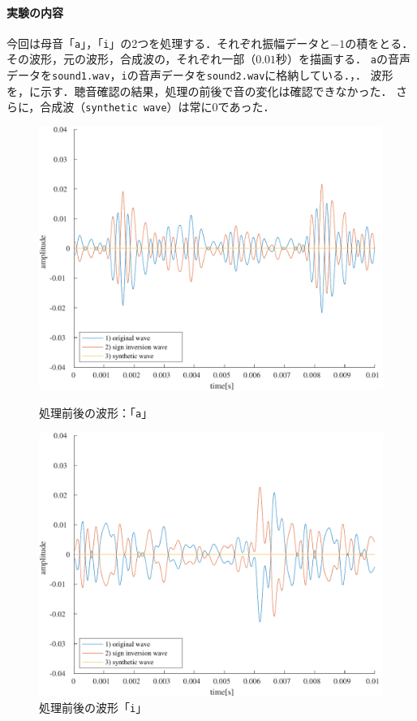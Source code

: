 \paragraph{実験の内容}
今回は母音「\texttt{a}」，「\texttt{i}」の2つを処理する．それぞれ振幅データと\(-1\)の積をとる．その波形，元の波形，合成波の，それぞれ一部（\(0.01\)秒）を描画する．
\texttt{a}の音声データを\texttt{sound1.wav}，\texttt{i}の音声データを\texttt{sound2.wav}に格納している．\scall{}，．
\result
波形を，に示す．聴音確認の結果，処理の前後で音の変化は確認できなかった．
さらに，合成波（\texttt{synthetic wave}）は常に\(0\)であった．
\begin{figure}[h]
    \centering
    \begin{minipage}[b]{.48\textwidth}
        \centering
        \includegraphics[keepaspectratio,width=\textwidth]{../../Figures/03_2_a.pdf}
        \caption{処理前後の波形：「\texttt{a}」}
        \label{fig:処理前後の波形_a}
    \end{minipage}
    \begin{minipage}[b]{.48\textwidth}
        \centering
        \includegraphics[keepaspectratio,width=\textwidth]{../../Figures/03_2_i.pdf}
        \caption{処理前後の波形「\texttt{i}」}
        \label{fig:処理前後の波形_i}
    \end{minipage}
\end{figure}
